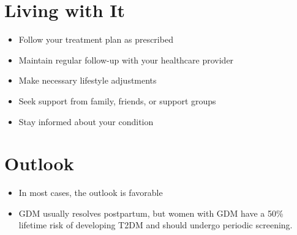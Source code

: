 \section{Living with It}
\begin{itemize}[noitemsep]
  \item Follow your treatment plan as prescribed
  \item Maintain regular follow-up with your healthcare provider
  \item Make necessary lifestyle adjustments
  \item Seek support from family, friends, or support groups
  \item Stay informed about your condition
\end{itemize}
\section{Outlook}
\begin{itemize}[noitemsep]
  \item In most cases, the outlook is favorable
  \item GDM usually resolves postpartum, but women with GDM have a 50\% lifetime risk of developing T2DM and should undergo periodic screening.
\end{itemize}
